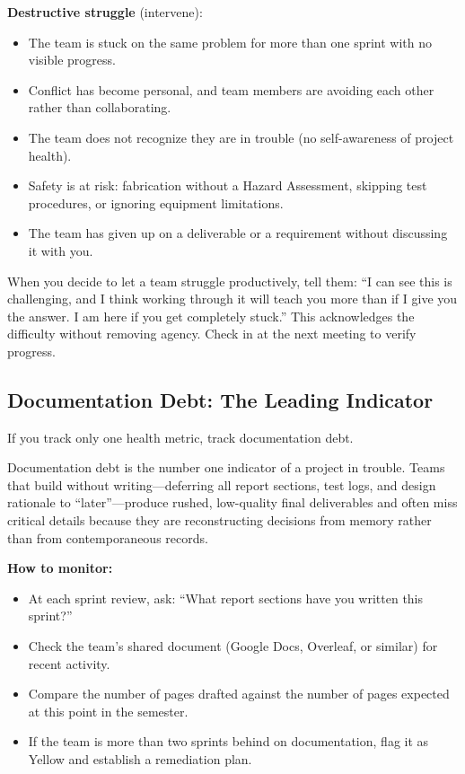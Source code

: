 \textbf{Destructive struggle} (intervene):
\begin{itemize}[nosep,leftmargin=1.5em]
\item The team is stuck on the same problem for more than one sprint with no visible progress.
\item Conflict has become personal, and team members are avoiding each other rather than collaborating.
\item The team does not recognize they are in trouble (no self-awareness of project health).
\item Safety is at risk: fabrication without a Hazard Assessment, skipping test procedures, or ignoring equipment limitations.
\item The team has given up on a deliverable or a requirement without discussing it with you.
\end{itemize}

\begin{bestpractice}
When you decide to let a team struggle productively, tell them: ``I can see this is challenging, and I think working through it will teach you more than if I give you the answer. I am here if you get completely stuck.'' This acknowledges the difficulty without removing agency. Check in at the next meeting to verify progress.
\end{bestpractice}

\subsection{Documentation Debt: The Leading Indicator}

If you track only one health metric, track documentation debt.

\begin{redflag}
Documentation debt is the number one indicator of a project in trouble. Teams that build without writing---deferring all report sections, test logs, and design rationale to ``later''---produce rushed, low-quality final deliverables and often miss critical details because they are reconstructing decisions from memory rather than from contemporaneous records.
\end{redflag}

\textbf{How to monitor:}
\begin{itemize}[nosep,leftmargin=1.5em]
\item At each sprint review, ask: ``What report sections have you written this sprint?''
\item Check the team's shared document (Google Docs, Overleaf, or similar) for recent activity.
\item Compare the number of pages drafted against the number of pages expected at this point in the semester.
\item If the team is more than two sprints behind on documentation, flag it as Yellow and establish a remediation plan.
\end{itemize}

